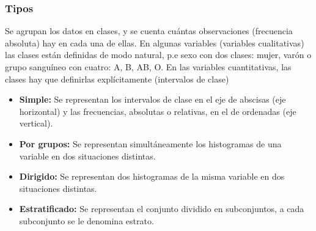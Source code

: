 \vskip 1cm 
\subsubsection{Tipos}
Se agrupan los datos en clases, y se cuenta cuántas observaciones (frecuencia absoluta) hay en cada una de ellas. En algunas variables (variables cualitativas) las clases están definidas de modo natural, p.e sexo con dos clases: mujer, varón o grupo sanguíneo con cuatro: A, B, AB, O. En las variables cuantitativas, las clases hay que definirlas explícitamente (intervalos de clase) \citep{histograma_tipos}

\begin{itemize}
	\item \textbf{Simple:} Se representan los intervalos de clase en el eje de abscisas (eje horizontal) y las frecuencias, absolutas o relativas, en el de ordenadas (eje vertical).
	
	
	\item \textbf{Por grupos:} Se representan simultáneamente los histogramas de una variable en dos situaciones distintas.
	
	\item \textbf{Dirigido:} Se representan dos histogramas de la misma variable en dos situaciones distintas.
	
	\item \textbf{Estratificado:} Se representan el conjunto dividido en subconjuntos, a cada subconjunto se le denomina estrato.
	
\end{itemize}

\vskip 1cm 
